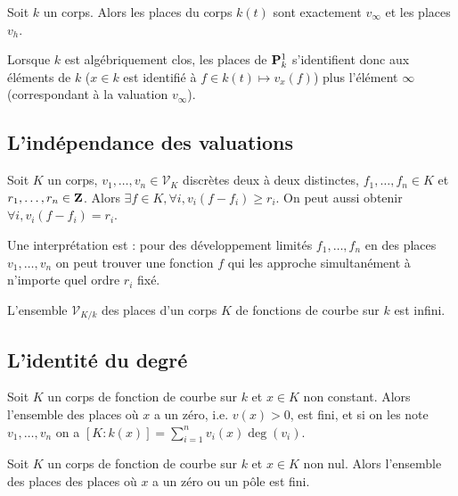 	\begin{pop}
		Soit $k$ un corps.
		Alors les places du corps $k(t)$ sont exactement $v_\infty$ et les places $v_h$.
	\end{pop}
	
	\begin{rem}
		Lorsque $k$ est algébriquement clos, les places de $\mathbf{P}_k^1$ s'identifient donc aux éléments de $k$ ($x \in k$ est identifié à $f \in k(t) \mapsto v_x(f)$) plus l'élément $\infty$ (correspondant à la valuation $v_\infty$).
	\end{rem}

\subsection{L'indépendance des valuations}

	\begin{thm}
		Soit $K$ un corps, $v_1,\ldots,v_n \in \mathscr{V}_K$ discrètes deux à deux distinctes, $f_1,\ldots,f_n \in K$ et $r_1,\ldots,r_n \in \mathbf{Z}$.
		Alors $\exists f \in K, \forall i, v_i (f - f_i) \geq r_i$.
		On peut aussi obtenir $\forall i, v_i (f - f_i) = r_i$.
	\end{thm}
	
	Une interprétation est : pour des développement limités $f_1,\ldots,f_n$ en des places $v_1,\ldots,v_n$ on peut trouver une fonction $f$ qui les approche simultanément à n'importe quel ordre $r_i$ fixé.

	\begin{cor}
		L'ensemble $\mathscr{V}_{K/k}$ des places d'un corps $K$ de fonctions de courbe sur $k$ est infini.
	\end{cor}



\subsection{L'identité du degré}

	\begin{thm}
		Soit $K$ un corps de fonction de courbe sur $k$ et $x \in K$ non constant.
		Alors l'ensemble des places où $x$ a un zéro, i.e. $v(x) > 0$, est fini, et si on les note $v_1,\ldots,v_n$ on a $[K : k(x)] = \sum_{i = 1}^n v_i(x) \deg(v_i)$.
	\end{thm}
	
	\begin{cor}
		Soit $K$ un corps de fonction de courbe sur $k$ et $x \in K$ non nul.
		Alors l'ensemble des places des places où $x$ a un zéro ou un pôle est fini.
	\end{cor}
	
